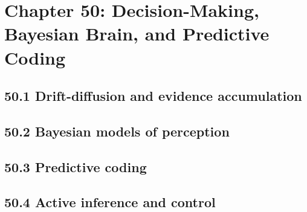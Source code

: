 \section{Chapter 50: Decision-Making, Bayesian Brain, and Predictive Coding}

\subsection{50.1 Drift-diffusion and evidence accumulation}

\subsection{50.2 Bayesian models of perception}

\subsection{50.3 Predictive coding}

\subsection{50.4 Active inference and control}

\clearpage
